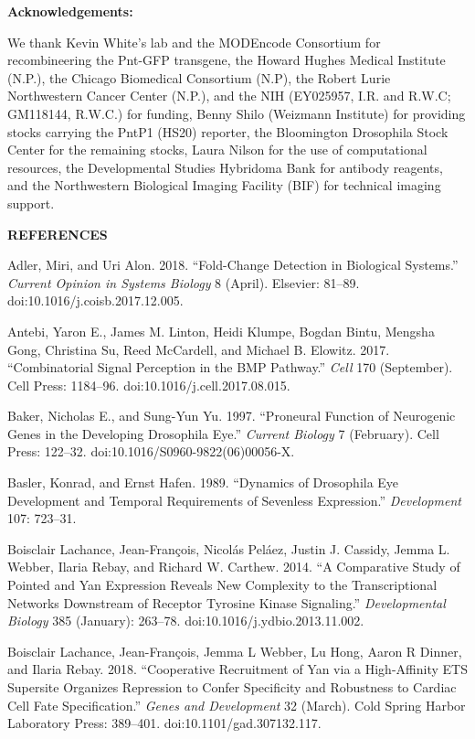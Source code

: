 \textbf{Acknowledgements:}

We thank Kevin White's lab and the MODEncode Consortium for recombineering the Pnt-GFP transgene, the Howard Hughes Medical Institute (N.P.), the Chicago Biomedical Consortium (N.P), the Robert Lurie Northwestern Cancer Center (N.P.), and the NIH (EY025957, I.R. and R.W.C; GM118144, R.W.C.) for funding, Benny Shilo (Weizmann Institute) for providing stocks carrying the PntP1 (HS20) reporter, the Bloomington Drosophila Stock Center for the remaining stocks, Laura Nilson for the use of computational resources, the Developmental Studies Hybridoma Bank for antibody reagents, and the Northwestern Biological Imaging Facility (BIF) for technical imaging support.

\textbf{REFERENCES}

Adler, Miri, and Uri Alon. 2018. ``Fold-Change Detection in Biological Systems.'' \emph{Current Opinion in Systems Biology} 8 (April). Elsevier: 81--89. doi:10.1016/j.coisb.2017.12.005.

Antebi, Yaron E., James M. Linton, Heidi Klumpe, Bogdan Bintu, Mengsha Gong, Christina Su, Reed McCardell, and Michael B. Elowitz. 2017. ``Combinatorial Signal Perception in the BMP Pathway.'' \emph{Cell} 170 (September). Cell Press: 1184--96. doi:10.1016/j.cell.2017.08.015.

Baker, Nicholas E., and Sung-Yun Yu. 1997. ``Proneural Function of Neurogenic Genes in the Developing Drosophila Eye.'' \emph{Current Biology} 7 (February). Cell Press: 122--32. doi:10.1016/S0960-9822(06)00056-X.

Basler, Konrad, and Ernst Hafen. 1989. ``Dynamics of Drosophila Eye Development and Temporal Requirements of Sevenless Expression.'' \emph{Development} 107: 723--31.

Boisclair Lachance, Jean-François, Nicolás Peláez, Justin J. Cassidy, Jemma L. Webber, Ilaria Rebay, and Richard W. Carthew. 2014. ``A Comparative Study of Pointed and Yan Expression Reveals New Complexity to the Transcriptional Networks Downstream of Receptor Tyrosine Kinase Signaling.'' \emph{Developmental Biology} 385 (January): 263--78. doi:10.1016/j.ydbio.2013.11.002.

Boisclair Lachance, Jean-François, Jemma L Webber, Lu Hong, Aaron R Dinner, and Ilaria Rebay. 2018. ``Cooperative Recruitment of Yan via a High-Affinity ETS Supersite Organizes Repression to Confer Specificity and Robustness to Cardiac Cell Fate Specification.'' \emph{Genes and Development} 32 (March). Cold Spring Harbor Laboratory Press: 389--401. doi:10.1101/gad.307132.117.

